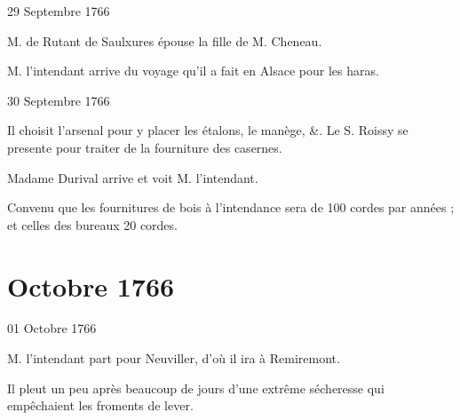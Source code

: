                      \begin{diary}{29 Septembre 1766}{}


                           M. de Rutant de Saulxures épouse
                              la fille
                              de M. Cheneau.
                        \bigskip



                           M. l’intendant arrive du voyage
                           qu’il a
                           fait en Alsace pour les haras.
                        \bigskip


                     \end{diary}

                     \begin{diary}{30 Septembre 1766}{}

                         Il choisit l’arsenal pour y placer les étalons,
                           le manège, \&. Le S. Roissy
                           se presente
                           pour traiter de la fourniture des
                              casernes. \bigskip



                           Madame Durival arrive et voit M. l’intendant. \bigskip


                         Convenu que les fournitures de bois à
                              l’intendance
                           sera de 100 cordes par années ; et celles
                           des bureaux 20 cordes. \bigskip


                     \end{diary}
                  \chapter*{Octobre 1766}




                     \begin{diary}{01 Octobre 1766}{}

                         M. l’intendant part pour Neuviller, d’où
                           il ira à Remiremont. \bigskip


                         Il pleut un peu après beaucoup de
                           jours
                           d’une extrême sécheresse qui empêchaient
                           les froments de lever. \bigskip


                     \end{diary}

